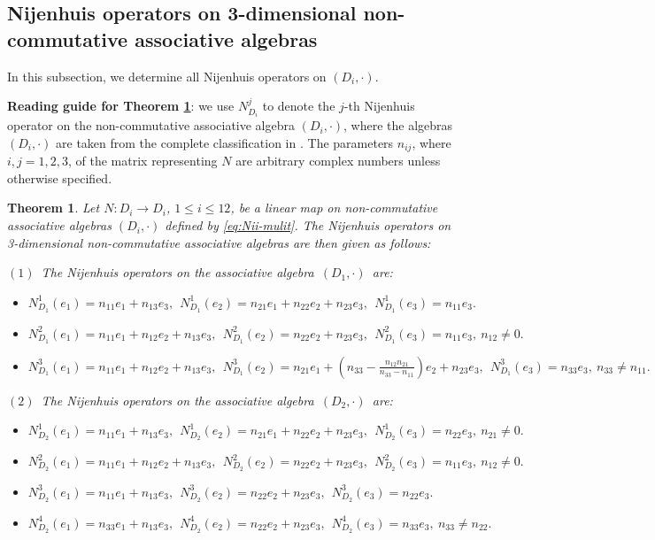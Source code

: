 \documentclass[12pt, reqno]{amsart}
\theoremstyle{plain}
\newtheorem{theorem}{Theorem}[section]
\begin{document}
\subsection{Nijenhuis operators on 3-dimensional non-commutative associative algebras}
In this subsection, we determine all Nijenhuis operators on $(D_i,\cdot)$. 

\textbf{Reading guide for Theorem \ref{Ni ope on 3 non c a }}: we use $N_{D_{i}}^j$ to denote the $j$-th Nijenhuis operator on the non-commutative associative algebra $(D_i, \cdot)$, where the algebras $(D_i, \cdot)$ are taken from the complete classification in \cite{Bai-1}. The parameters $n_{ij}$, where $i,j=1,2,3$, of the matrix representing $N$ are arbitrary complex numbers unless otherwise specified.

\begin{theorem}\label{Ni ope on 3 non c a }
Let $N:D_i\rightarrow D_i$, $1 \leq i \leq 12$, be a linear map on non-commutative associative algebras $(D_i, \cdot)$ defined by \eqref{eq:Nii-mulit}. The Nijenhuis operators on 3-dimensional non-commutative associative algebras are then given as follows:

$(1)$~The Nijenhuis operators on the associative algebra~$(D_{1},\cdot)$~are:
\begin{itemize}
   \item[]  $N_{D_{1}}^1(e_1)=n_{11}e_1+  n_{13}e_3 ,~~ N_{D_{1}}^1(e_2)= n_{21}e_1+ n_{22}e_2+ n_{23}e_3 ,~~ N_{D_{1}}^1(e_3)=  n_{11}e_3.$
         \item[]  $N_{D_{1}}^2(e_1)=n_{11}e_1+n_{12}e_2+  n_{13}e_3 ,~~ N_{D_{1}}^2(e_2)= n_{22}e_2+ n_{23}e_3 ,~~ N_{D_{1}}^2(e_3)=  n_{11}e_3,~n_{12}\neq0.$
         \item[]  $N_{D_{1}}^3(e_1)=n_{11}e_1+n_{12}e_2+  n_{13}e_3 ,~~ N_{D_{1}}^3(e_2)= n_{21}e_1+ (n_{33}-\frac{n_{12}n_{21}}{n_{33}-n_{11}})e_2+ n_{23}e_3 ,~~ N_{D_{1}}^3(e_3)=  n_{33}e_3,~n_{33}\neq n_{11}.$
   \end{itemize}

$(2)$~The Nijenhuis operators on the associative algebra~$(D_{2},\cdot)$~are:
\begin{itemize}
  \item[]  $N_{D_{2}}^1(e_1)=n_{11}e_1+  n_{13}e_3 ,~~ N_{D_{2}}^1(e_2)= n_{21}e_1+ n_{22}e_2+ n_{23}e_3 ,~~ N_{D_{2}}^1(e_3)=  n_{22}e_3,~n_{21}\neq0.$
         \item[]  $N_{D_{2}}^2(e_1)=n_{11}e_1+n_{12}e_2+  n_{13}e_3 ,~~ N_{D_{2}}^2(e_2)= n_{22}e_2+ n_{23}e_3 ,~~ N_{D_{2}}^2(e_3)=  n_{11}e_3,~n_{12}\neq0.$
         \item[]  $N_{D_{2}}^3(e_1)=n_{11}e_1+  n_{13}e_3 ,~~ N_{D_{2}}^3(e_2)= n_{22}e_2+ n_{23}e_3 ,
             ~~ N_{D_{2}}^3(e_3)=  n_{22}e_3.$
          \item[]  $N_{D_{2}}^4(e_1)=n_{33}e_1+  n_{13}e_3 ,~~ N_{D_{2}}^4(e_2)= n_{22}e_2+ n_{23}e_3 ,
             ~~ N_{D_{2}}^4(e_3)=  n_{33}e_3,~n_{33}\neq n_{22}.$
   \end{itemize}


\end{theorem}
\end{document}
